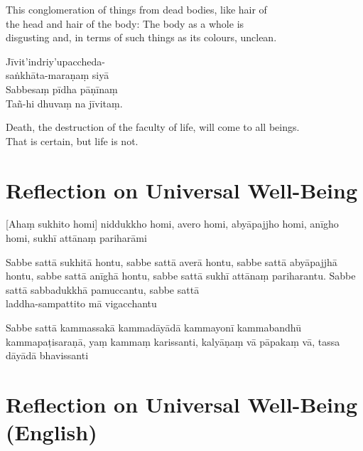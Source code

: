 \begin{english}
  This conglomeration of things from dead bodies, like hair of\\
  the head and hair of the body: The body as a whole is\\
  disgusting and, in terms of such things as its colours, unclean.
\end{english}

Jīvit'indriy'upaccheda-\\
saṅkhāta-maraṇaṃ siyā\\
Sabbesaṃ pīdha pāṇīnaṃ\\
Tañ-hi dhuvaṃ na jīvitaṃ.

\begin{english}
  Death, the destruction of the faculty of life, will come to all beings.\\
  That is certain, but life is not.
\end{english}

\section{Reflection on Universal Well-Being}


\begin{leader}
\end{leader}


[Ahaṃ sukhito homi] niddukkho homi, avero homi, abyāpajjho homi, anīgho homi,
sukhī attānaṃ pariharāmi

Sabbe sattā sukhitā hontu, sabbe sattā averā hontu, sabbe sattā abyāpajjhā
hontu, sabbe sattā anīghā hontu, sabbe sattā sukhī attānaṃ pariharantu. Sabbe
sattā sabbadukkhā pamuccantu, sabbe sattā\\
laddha-sampattito mā vigacchantu

Sabbe sattā kammassakā kammadāyādā kammayonī kammabandhū kammapaṭisaraṇā,
yaṃ kammaṃ karissanti, kalyāṇaṃ vā pāpakaṃ vā, tassa dāyādā bhavissanti


\section{Reflection on Universal Well-Being (English)}

\begin{leader}
\end{leader}

